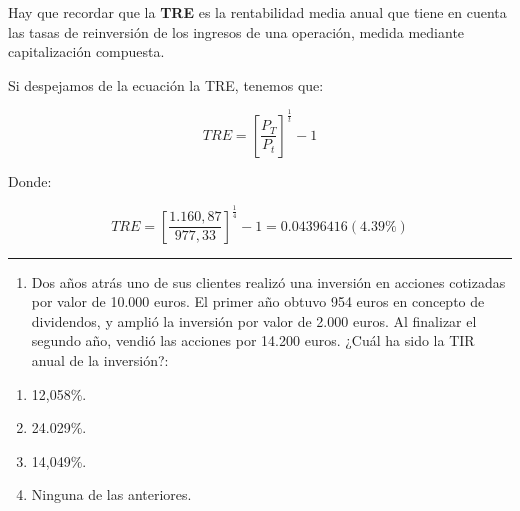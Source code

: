 \documentclass[
  letterpaper,
  DIV=11,
  numbers=noendperiod]{scrreprt}
\providecommand{\tightlist}{%
  \setlength{\itemsep}{0pt}\setlength{\parskip}{0pt}}\usepackage{longtable,booktabs,array}
\begin{document}
\begin{tcolorbox}[enhanced jigsaw, left=2mm, opacityback=0, colback=white, breakable, arc=.35mm, bottomrule=.15mm, rightrule=.15mm, toprule=.15mm, leftrule=.75mm, colframe=quarto-callout-tip-color-frame]
\begin{minipage}[t]{\textwidth - 5.5mm}
Hay que recordar que la \textbf{TRE} es la rentabilidad media anual que
tiene en cuenta las tasas de reinversión de los ingresos de una
operación, medida mediante capitalización compuesta.

Si despejamos de la ecuación la TRE, tenemos que:

\[{ { { TRE=}\left[ \frac { { P }_{ T } }{ { P }_{ t } }  \right]  }^{ \frac { 1 }{ t }  } }-1\]

Donde:

\[{ { { TRE=  } \left[ \frac { 1.160,87 }{ 977,33 }  \right]  }^{ \frac { 1 }{ 4 }  } }-1=0.04396416(4.39\%)\]

\end{minipage}%
\end{tcolorbox}

\begin{center}\rule{0.5\linewidth}{0.5pt}\end{center}

\begin{enumerate}
\def\labelenumi{\arabic{enumi}.}
\setcounter{enumi}{96}
\tightlist
\item
  Dos años atrás uno de sus clientes realizó una inversión en acciones
  cotizadas por valor de 10.000 euros. El primer año obtuvo 954 euros en
  concepto de dividendos, y amplió la inversión por valor de 2.000
  euros. Al finalizar el segundo año, vendió las acciones por 14.200
  euros. ¿Cuál ha sido la TIR anual de la inversión?:
\end{enumerate}

\begin{enumerate}
\def\labelenumi{\alph{enumi})}
\item
  12,058\%.
\item
  24.029\%.
\item
  14,049\%.
\item
  Ninguna de las anteriores.
\end{enumerate}
\end{document}
